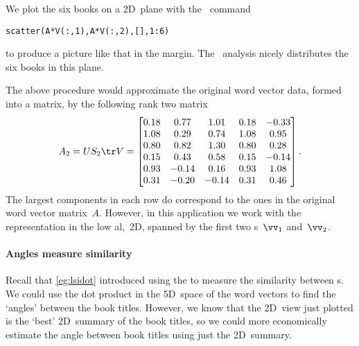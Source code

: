 \begin{enumerate}
{}
We plot the six books on a 2D~plane with the \script\ command
\begin{verbatim}
scatter(A*V(:,1),A*V(:,2),[],1:6)
\end{verbatim}
to produce a picture like that in the margin.
The \svd\ analysis nicely distributes the six books in this plane.
\end{enumerate}

The above procedure would approximate the original word vector data, formed into a matrix, by the following rank two matrix \twodp
\begin{equation*}
A_2=US_2\tr V
=\begin{bmatrix} 0.18&0.77&1.01&0.18&-0.33
\\1.08&0.29&0.74&1.08&0.95
\\0.80&0.82&1.30&0.80&0.28
\\0.15&0.43&0.58&0.15&-0.14
\\0.93&-0.14&0.16&0.93&1.08
\\0.31&-0.20&-0.14&0.31&0.46 \end{bmatrix}.
\end{equation*}
The largest components in each row do correspond to the ones in the original word vector matrix~\(A\).
However, in this application we work with the representation in the low al,~2D,  spanned by the first two s~\(\vv_1\) and~\(\vv_2\).


\paragraph{Angles measure similarity}
Recall that \autoref{eg:lsidot} introduced using the  to measure the similarity between s.
We could use the dot product in the 5D~space of the word vectors to find the `angles' between the book titles.
However, we know that the 2D~view just plotted is the `best' 2D~summary of the book titles, so we could more economically estimate the angle between book titles using just the 2D~summary.


